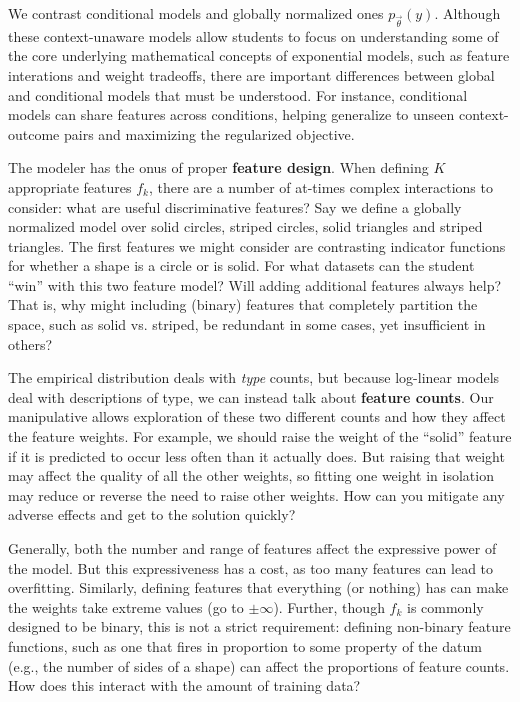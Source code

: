 \documentclass[11pt,letterpaper]{article}
\begin{document}
We contrast conditional models and globally normalized ones
$p_{\vec{\theta}}\left(y\right)$. Although
these context-unaware models allow students to focus on
understanding some of the core underlying mathematical concepts of
exponential models, such as feature interations and weight tradeoffs,
there are important differences between global and conditional models
that must be understood. For instance, conditional models can share 
features across conditions, helping generalize to unseen context-outcome 
pairs and maximizing the regularized objective.

The modeler has the onus of proper \textbf{feature design}. When defining $K$ 
appropriate features $f_k$, there are a number of at-times complex interactions 
to consider: what are useful discriminative features? Say we define a globally 
normalized model over solid circles, striped circles, solid triangles and striped triangles. 
The first features we might consider are contrasting indicator functions for whether a shape
is a circle or is solid. For what datasets can the student ``win'' with this two feature model? 
Will adding additional features always help? That is, why might including (binary) 
features that completely partition the space, such as solid vs. striped, be redundant in some 
cases, yet insufficient in others?

The empirical distribution deals with \textit{type} counts, but because log-linear models 
deal with descriptions of type, we can instead talk about \textbf{feature counts}. Our 
manipulative allows exploration of these two different counts and how they affect the 
feature weights. For example, we should raise the weight of the “solid” feature if it is 
predicted to occur less often than it actually does. But raising that weight 
may affect the quality of all the other weights, so fitting one weight in
isolation may reduce or reverse the need to raise other weights. How can you mitigate any 
adverse effects and get to the solution quickly?

Generally, both the number and range of features affect the expressive 
power of the model. But this expressiveness has a cost, as too many features can lead to overfitting. 
Similarly, defining features that everything (or nothing) has can make the weights 
take extreme values (go to $\pm \infty$). Further, though $f_k$ is commonly designed to be binary, 
this is not a strict requirement: defining non-binary feature functions, such as one that fires in 
proportion to some property of the datum (e.g., the number of sides of a shape) can affect the
proportions of feature counts. How does this interact with the amount of training data?
\end{document}
